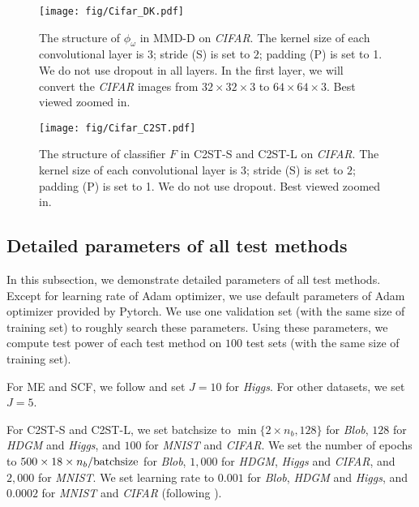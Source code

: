 \documentclass{article}
\begin{document}
\begin{figure}[!t]
    \begin{center}
        \texttt{[image: fig/Cifar\_DK.pdf]}
        \caption{The structure of $\phi_\omega$ in MMD-D on \emph{CIFAR}. The kernel size of each convolutional layer is $3$; stride (S) is set to $2$; padding (P) is set to 1. We do not use dropout in all layers. In the first layer, we will convert the \emph{CIFAR} images from $32\times 32\times 3$ to $64\times 64\times 3$. Best viewed zoomed in.}  \label{fig:MMD_CIFAR_F}
    \end{center}
\end{figure}

\begin{figure}[!t]
    \begin{center}
        \texttt{[image: fig/Cifar\_C2ST.pdf]}
        \caption{The structure of classifier $F$ in C2ST-S and C2ST-L on \emph{CIFAR}. The kernel size of each convolutional layer is $3$; stride (S) is set to $2$; padding (P) is set to 1. We do not use dropout. Best viewed zoomed in.} \label{fig:C2ST_CIFAR_F}
    \end{center}
\end{figure}

\subsection{Detailed parameters of all test methods}\label{Asec:para_set}

In this subsection, we demonstrate detailed parameters of all test methods. Except for learning rate of Adam optimizer, we use default parameters of Adam optimizer provided by Pytorch. We use one validation set (with the same size of training set) to roughly search these parameters. Using these parameters, we compute test power of each test method on $100$ test sets (with the same size of training set).

For ME and SCF, we follow \citet{Chwialkowski2015} and set $J=10$ for \emph{Higgs}. For other datasets, we set $J=5$.

For C2ST-S and C2ST-L, we set batchsize to $\min\{2\times n_b,128\}$ for \emph{Blob}, $128$ for \emph{HDGM} and \emph{Higgs}, and $100$ for \emph{MNIST} and \emph{CIFAR}. We set the number of epochs to $500\times 18\times n_b/\textnormal{batchsize}$ for \emph{Blob}, $1,000$ for \emph{HDGM}, \emph{Higgs} and \emph{CIFAR}, and $2,000$ for \emph{MNIST}. We set learning rate to $0.001$ for \emph{Blob}, \emph{HDGM} and \emph{Higgs}, and $0.0002$ for \emph{MNIST} and \emph{CIFAR} (following \citet{DCGAN_Radford}).
\end{document}
